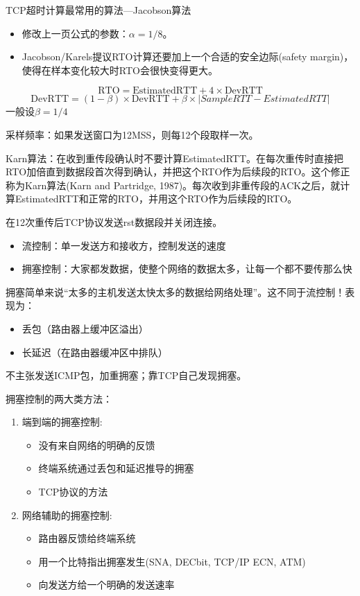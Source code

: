 TCP超时计算最常用的算法---Jacobson算法
\begin{itemize}
    \item 修改上一页公式的参数：$\alpha=1/8$。
    \item Jacobson/Karels提议RTO计算还要加上一个合适的安全边际(safety margin)，使得在样本变化较大时RTO会很快变得更大。
\end{itemize}
\[\text{RTO} = \text{EstimatedRTT} + 4\times \text{DevRTT}\]
\[\text{DevRTT} =(1-\beta)\times\text{DevRTT} + \beta\times|SampleRTT-EstimatedRTT|\]
一般设$\beta = 1/4$

采样频率：如果发送窗口为12MSS，则每12个段取样一次。

Karn算法：在收到重传段确认时不要计算EstimatedRTT。在每次重传时直接把RTO加倍直到数据段首次得到确认，并把这个RTO作为后续段的RTO。这个修正称为Karn算法(Karn and Partridge, 1987)。每次收到非重传段的ACK之后，就计算EstimatedRTT和正常的RTO，并用这个RTO作为后续段的RTO。

在12次重传后TCP协议发送rst数据段并关闭连接。

\begin{itemize}
\item 流控制：单一发送方和接收方，控制发送的速度
\item 拥塞控制：大家都发数据，使整个网络的数据太多，让每一个都不要传那么快
\end{itemize}

拥塞简单来说“太多的主机发送太快太多的数据给网络处理”。这不同于流控制！表现为：
\begin{itemize}
    \item 丢包（路由器上缓冲区溢出）
    \item 长延迟（在路由器缓冲区中排队）
\end{itemize}
不主张发送ICMP包，加重拥塞；靠TCP自己发现拥塞。

拥塞控制的两大类方法：
\begin{enumerate}
    \item 端到端的拥塞控制:
\begin{itemize}
    \item 没有来自网络的明确的反馈
    \item 终端系统通过丢包和延迟推导的拥塞
    \item TCP协议的方法
\end{itemize}
    \item 网络辅助的拥塞控制:
\begin{itemize}
    \item 路由器反馈给终端系统
    \item 用一个比特指出拥塞发生(SNA, DECbit, TCP/IP ECN, ATM)
    \item 向发送方给一个明确的发送速率
\end{itemize}
\end{enumerate}

